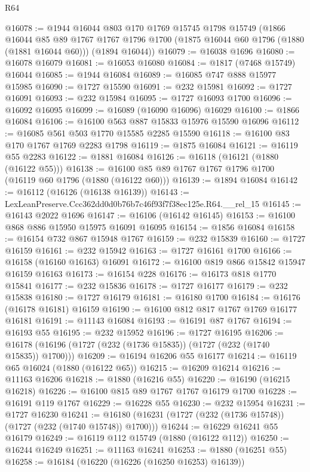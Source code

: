 \begin{lexlean}{R64}
\begin{coremodule}
@16078 := @1944
    @16044
    @803
    @170
    @1769
    @15745
    @1798
    @15749
    (@1866
      @16044
      @85
      @89
      @1767
      @1767
      @1796
      @1700
      (@1875 @16044 @60 @1796 (@1880 (@1881 @16044 @60)))
      (@1894 @16044))
@16079 := @16038 @1696
@16080 := @16078 @16079
@16081 := @16053 @16080
@16084 := @1817 (@7468 @15749) @16044
@16085 := @1944 @16084
@16089 := @16085 @747 @888 @15977 @15985
@16090 := @1727 @15590
@16091 := @232 @15981
@16092 := @1727 @16091
@16093 := @232 @15984
@16095 := @1727 @16093 @1700
@16096 := @16092 @16095
@16099 := @16089 (@16090 @16096) @16029
@16100 := @1866 @16084
@16106 := @16100 @563 @887 @15833 @15976 @15590 @16096
@16112 := @16085 @561 @503 @1770 @15585 @2285 @15590
@16118 := @16100 @83 @170 @1767 @1769 @2283 @1798
@16119 := @1875 @16084
@16121 := @16119 @55 @2283
@16122 := @1881 @16084
@16126 := @16118 (@16121 (@1880 (@16122 @55)))
@16138 := @16100 @85 @89 @1767 @1767 @1796 @1700 (@16119 @60 @1796 (@1880 (@16122 @60)))
@16139 := @1894 @16084
@16142 := @16112 (@16126 (@16138 @16139))
@16143 := LexLeanPreserve.Ccc362dd0d0b76b7c46f93f7f38ec125e.R64.__rel_15
@16145 := @16143 @2022 @1696
@16147 := @16106 (@16142 @16145)
@16153 := @16100 @868 @886 @15950 @15975 @16091 @16095
@16154 := @1856 @16084
@16158 := @16154 @732 @867 @15948 @1767
@16159 := @232 @15839
@16160 := @1727 @16159
@16161 := @232 @15942
@16163 := @1727 @16161 @1700
@16166 := @16158 (@16160 @16163) @16091
@16172 := @16100 @819 @866 @15842 @15947 @16159 @16163
@16173 := @16154 @228
@16176 := @16173 @818 @1770 @15841
@16177 := @232 @15836
@16178 := @1727 @16177
@16179 := @232 @15838
@16180 := @1727 @16179
@16181 := @16180 @1700
@16184 := @16176 (@16178 @16181) @16159
@16190 := @16100 @812 @817 @1767 @1769 @16177 @16181
@16191 := @11143 @16084
@16193 := @16191 @87 @1767
@16194 := @16193 @55
@16195 := @232 @15952
@16196 := @1727 @16195
@16206 := @16178 (@16196 (@1727 (@232 (@1736 @15835)) (@1727 (@232 (@1740 @15835)) @1700)))
@16209 := @16194 @16206 @55 @16177
@16214 := @16119 @65 @16024 (@1880 (@16122 @65))
@16215 := @16209 @16214
@16216 := @11163 @16206
@16218 := @1880 (@16216 @55)
@16220 := @16190 (@16215 @16218)
@16226 := @16100 @815 @89 @1767 @1767 @16179 @1700
@16228 := @16191 @119 @1767
@16229 := @16228 @55
@16230 := @232 @15954
@16231 := @1727 @16230
@16241 := @16180 (@16231 (@1727 (@232 (@1736 @15748)) (@1727 (@232 (@1740 @15748)) @1700)))
@16244 := @16229 @16241 @55 @16179
@16249 := @16119 @112 @15749 (@1880 (@16122 @112))
@16250 := @16244 @16249
@16251 := @11163 @16241
@16253 := @1880 (@16251 @55)
@16258 := @16184 (@16220 (@16226 (@16250 @16253) @16139))

\end{coremodule}
\end{lexlean}
